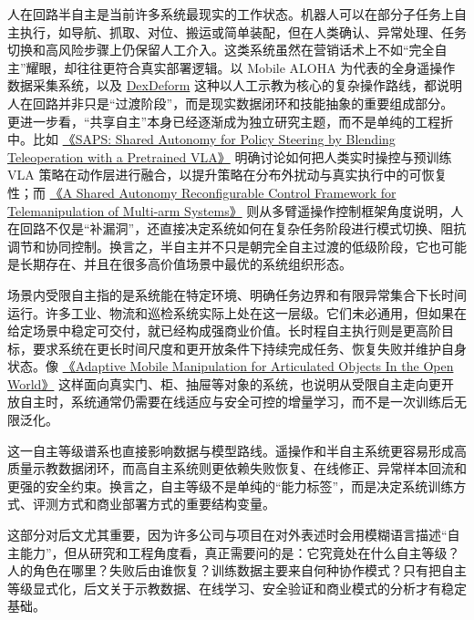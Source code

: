 人在回路半自主是当前许多系统最现实的工作状态。机器人可以在部分子任务上自主执行，如导航、抓取、对位、搬运或简单装配，但在人类确认、异常处理、任务切换和高风险步骤上仍保留人工介入。这类系统虽然在营销话术上不如“完全自主”耀眼，却往往更符合真实部署逻辑。以 Mobile ALOHA 为代表的全身遥操作数据采集系统，以及 \href{https://arxiv.org/abs/2304.03223}{DexDeform} 这种以人工示教为核心的复杂操作路线，都说明人在回路并非只是“过渡阶段”，而是现实数据闭环和技能抽象的重要组成部分。 更进一步看，“共享自主”本身已经逐渐成为独立研究主题，而不是单纯的工程折中。比如 \href{https://arxiv.org/abs/2606.15568}{《SAPS: Shared Autonomy for Policy Steering by Blending Teleoperation with a Pretrained VLA》} 明确讨论如何把人类实时操控与预训练 VLA 策略在动作层进行融合，以提升策略在分布外扰动与真实执行中的可恢复性；而 \href{https://arxiv.org/abs/2207.09813}{《A Shared Autonomy Reconfigurable Control Framework for Telemanipulation of Multi-arm Systems》} 则从多臂遥操作控制框架角度说明，人在回路不仅是“补漏洞”，还直接决定系统如何在复杂任务阶段进行模式切换、阻抗调节和协同控制。换言之，半自主并不只是朝完全自主过渡的低级阶段，它也可能是长期存在、并且在很多高价值场景中最优的系统组织形态。

场景内受限自主指的是系统能在特定环境、明确任务边界和有限异常集合下长时间运行。许多工业、物流和巡检系统实际上处在这一层级。它们未必通用，但如果在给定场景中稳定可交付，就已经构成强商业价值。长时程自主执行则是更高阶目标，要求系统在更长时间尺度和更开放条件下持续完成任务、恢复失败并维护自身状态。像 \href{https://arxiv.org/abs/2401.14403}{《Adaptive Mobile Manipulation for Articulated Objects In the Open World》} 这样面向真实门、柜、抽屉等对象的系统，也说明从受限自主走向更开放自主时，系统通常仍需要在线适应与安全可控的增量学习，而不是一次训练后无限泛化。

这一自主等级谱系也直接影响数据与模型路线。遥操作和半自主系统更容易形成高质量示教数据闭环，而高自主系统则更依赖失败恢复、在线修正、异常样本回流和更强的安全约束。换言之，自主等级不是单纯的“能力标签”，而是决定系统训练方式、评测方式和商业部署方式的重要结构变量。

这部分对后文尤其重要，因为许多公司与项目在对外表述时会用模糊语言描述“自主能力”，但从研究和工程角度看，真正需要问的是：它究竟处在什么自主等级？人的角色在哪里？失败后由谁恢复？训练数据主要来自何种协作模式？只有把自主等级显式化，后文关于示教数据、在线学习、安全验证和商业模式的分析才有稳定基础。
